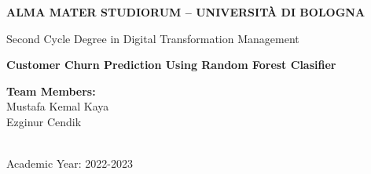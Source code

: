 \begin{titlepage}

	\begin{center}
		\textbf{ALMA MATER STUDIORUM -- UNIVERSITÀ DI BOLOGNA}
		\\
		\noindent\hrulefill
		\vspace{0.4cm}

        \large
		Second Cycle Degree in Digital Transformation Management
		
		\Huge
		\vspace{4cm}
		\textbf{Customer Churn Prediction Using Random Forest Clasifier}\\ 
		
		\large		
		\vspace{5.5cm}
		\begin{minipage}[t]{0.64\textwidth}
			\begin{flushleft}
                \vspace{0.2cm}
				
			\end{flushleft}
		\end{minipage}
		\begin{minipage}[t]{0.34\textwidth}
			\begin{flushright}
				\textbf{Team Members:} \\
				\vspace{0.2cm}
                Mustafa Kemal Kaya\\ 
                Ezginur Cendik
			\end{flushright}
		\end{minipage}


		\vfill
		\noindent\hrulefill
		\vspace{0.3cm}
		\large
        \\
		Academic Year: 2022-2023
  
	\end{center}
 
\end{titlepage}